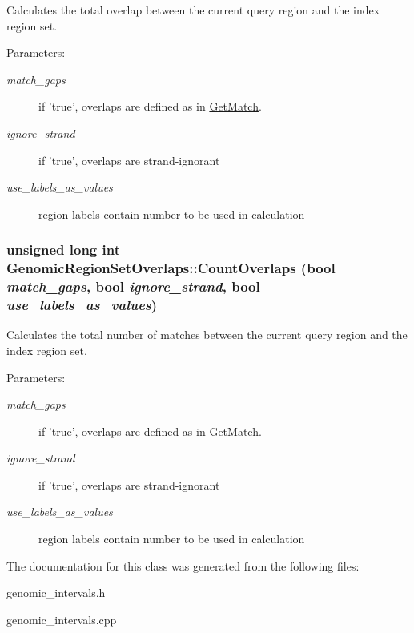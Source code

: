 Calculates the total overlap between the current query region and the index region set. 

\begin{Desc}
\item[Parameters:]
\begin{description}
\item[{\em match\_\-gaps}]if 'true', overlaps are defined as in \hyperlink{classGenomicRegionSetOverlaps_e6d1c3bd67b0a902649aab01909a9c10}{GetMatch}. \item[{\em ignore\_\-strand}]if 'true', overlaps are strand-ignorant \item[{\em use\_\-labels\_\-as\_\-values}]region labels contain number to be used in calculation \end{description}
\end{Desc}
\hypertarget{classGenomicRegionSetOverlaps_4ce9e8020fe69a410818a1a6e6f0e69b}{
\subsubsection[CountOverlaps]{\setlength{\rightskip}{0pt plus 5cm}unsigned long int GenomicRegionSetOverlaps::CountOverlaps (bool {\em match\_\-gaps}, \/  bool {\em ignore\_\-strand}, \/  bool {\em use\_\-labels\_\-as\_\-values})}}
\label{classGenomicRegionSetOverlaps_4ce9e8020fe69a410818a1a6e6f0e69b}


Calculates the total number of matches between the current query region and the index region set. 

\begin{Desc}
\item[Parameters:]
\begin{description}
\item[{\em match\_\-gaps}]if 'true', overlaps are defined as in \hyperlink{classGenomicRegionSetOverlaps_e6d1c3bd67b0a902649aab01909a9c10}{GetMatch}. \item[{\em ignore\_\-strand}]if 'true', overlaps are strand-ignorant \item[{\em use\_\-labels\_\-as\_\-values}]region labels contain number to be used in calculation \end{description}
\end{Desc}


The documentation for this class was generated from the following files:\begin{CompactItemize}
\item 
genomic\_\-intervals.h\item 
genomic\_\-intervals.cpp\end{CompactItemize}
